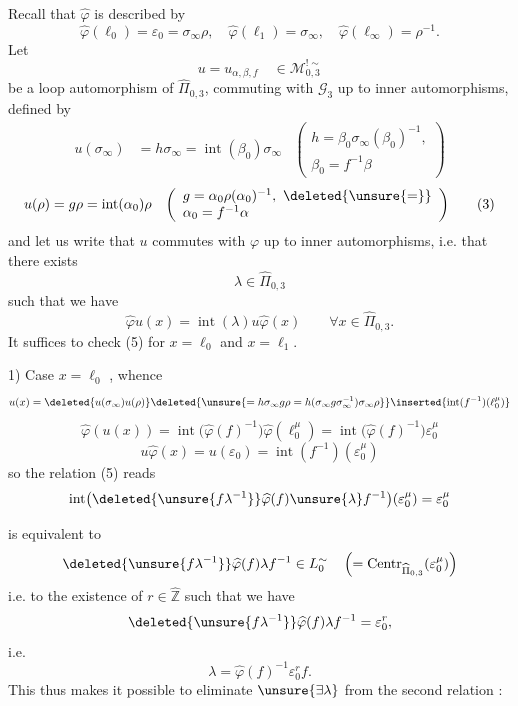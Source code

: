 Recall  that $\widehat\varphi$ is described by
\[
\widehat\varphi(\ell_0)=\varepsilon_0=\sigma_\infty\rho,\quad
\widehat\varphi(\ell_1)=\sigma_\infty,\quad
\widehat\varphi(\ell_\infty)=\rho^{-1}.
\tag{1}
\]
Let
\[
u=u_{\alpha,\beta,f}\quad\in\mathcal M_{0,3}^{!\sim}
\]
be a loop automorphism of $\widehat\Pi_{0,3}$, commuting with $\mathcal G_3$ up to inner automorphisms, defined by
\[
\begin{aligned}
u(\sigma_\infty)&=h\sigma_\infty=\operatorname{int}(\beta_0)\sigma_\infty
&\left(\begin{array}{l}h=\beta_0\sigma_\infty(\beta_0)^{-1},\\\beta_0=f^{-1}\beta\end{array}\right)
\end{aligned}
\tag{2}
\]
\[
\begin{aligned}
u(\rho)&=g\rho=\operatorname{int}(\alpha_0)\rho
&\left(\begin{array}{l}g=\alpha_0\rho(\alpha_0)^{-1},\ \deleted{\unsure{=}}\\\alpha_0=f^{-1}\alpha\end{array}\right)
\end{aligned}
\tag{3}
\]
and let us write that $u$ commutes with $\varphi$ up to inner automorphisms, i.e. that there exists \deleted{\unsure{$\lambda\in$}}
\[
\lambda\in\widehat\Pi_{0,3}
\tag{4}
\]
such that we have
\[
\widehat\varphi u(x)=\operatorname{int}(\lambda)u\widehat\varphi(x)
\qquad\forall x\in\widehat\Pi_{0,3}.
\tag{5}
\]
It suffices to check (5) for $x=\ell_0$ and $x=\ell_1$.

1) Case $x=\ell_0$ , whence
\[
u(x)=\deleted{u(\sigma_\infty)u(\rho)}\deleted{\unsure{=h\sigma_\infty g\rho=h(\sigma_\infty g\sigma_\infty^{-1})\sigma_\infty\rho}}
\inserted{\operatorname{int}(f^{-1})(\ell_0^\mu)}
\]
\[
\widehat\varphi(u(x))=\operatorname{int}\bigl(\widehat\varphi(f)^{-1}\bigr)\widehat\varphi(\ell_0^\mu)=\operatorname{int}\bigl(\widehat\varphi(f)^{-1}\bigr)\varepsilon_0^\mu
\]
\[
u\widehat\varphi(x)=u(\varepsilon_0)=\operatorname{int}(f^{-1})(\varepsilon_0^\mu)
\]
so the relation (5) reads
\[
\operatorname{int}\bigl(\deleted{\unsure{f\lambda^{-1}}}\widehat\varphi(f)\unsure{\lambda}f^{-1}\bigr)(\varepsilon_0^\mu)=\varepsilon_0^\mu
\]

is equivalent to
\[
\deleted{\unsure{f\lambda^{-1}}}\widehat\varphi(f)\lambda f^{-1}\in L_0^{\sim}\quad
\left(=\operatorname{Centr}_{\widehat\Pi_{0,3}}(\varepsilon_0^\mu)\right)
\]
i.e. to the existence of $r\in\widehat{\mathbb Z}$ such that we have
\[
\deleted{\unsure{f\lambda^{-1}}}\widehat\varphi(f)\lambda f^{-1}=\varepsilon_0^r,
\]
i.e.
\[
\lambda=\widehat\varphi(f)^{-1}\varepsilon_0^r f.
\tag{6}
\]
This thus makes it possible to eliminate $\unsure{\exists\lambda}$ from the second relation :

